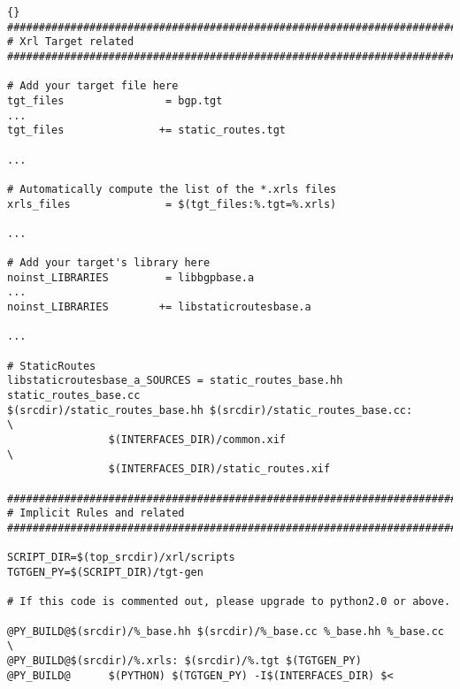 \documentclass[11pt]{article}
\newcommand{\stt}{\tt\small}
\begin{document}
\begin{lstlisting}[caption={Extracts from {\stt xorp/xrl/targets/Makefile.am} %
                                     \label{lst:tgt.makefile} } ]{}
###############################################################################
# Xrl Target related
###############################################################################

# Add your target file here
tgt_files                = bgp.tgt
...
tgt_files               += static_routes.tgt

...

# Automatically compute the list of the *.xrls files
xrls_files               = $(tgt_files:%.tgt=%.xrls)

...

# Add your target's library here
noinst_LIBRARIES         = libbgpbase.a
...
noinst_LIBRARIES        += libstaticroutesbase.a

...

# StaticRoutes
libstaticroutesbase_a_SOURCES = static_routes_base.hh static_routes_base.cc
$(srcdir)/static_routes_base.hh $(srcdir)/static_routes_base.cc:        \
                $(INTERFACES_DIR)/common.xif                            \
                $(INTERFACES_DIR)/static_routes.xif

###############################################################################
# Implicit Rules and related
###############################################################################

SCRIPT_DIR=$(top_srcdir)/xrl/scripts
TGTGEN_PY=$(SCRIPT_DIR)/tgt-gen

# If this code is commented out, please upgrade to python2.0 or above.

@PY_BUILD@$(srcdir)/%_base.hh $(srcdir)/%_base.cc %_base.hh %_base.cc   \
@PY_BUILD@$(srcdir)/%.xrls: $(srcdir)/%.tgt $(TGTGEN_PY)
@PY_BUILD@      $(PYTHON) $(TGTGEN_PY) -I$(INTERFACES_DIR) $<
\end{lstlisting}
\end{document}
